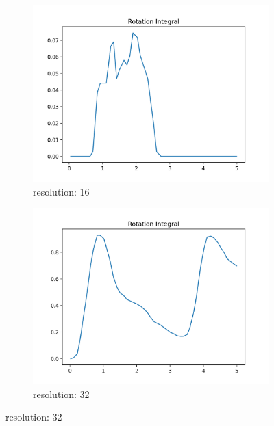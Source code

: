 \documentclass[a4paper,12pt]{article}
\begin{document}
\begin{figure}
     \centering
     \begin{subfigure}[b]{0.45\textwidth}
         \centering
         \includegraphics[width=\textwidth]{imgs/results-KHI-RE10000.0-RSL16-rr_integral}
         \caption{resolution: 16}
         \label{fig:re10000-rs16}
     \end{subfigure}
     \hfill
     \begin{subfigure}[b]{0.45\textwidth}
         \centering
         \includegraphics[width=\textwidth]{imgs/results-KHI-RE10000.0-RSL32-rr_integral}
         \caption{resolution: 32}
         \label{fig:re10000-rs32}
     \end{subfigure}
     \hfill

\end{figure}
\end{document}
